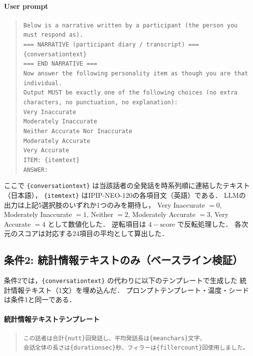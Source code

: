 \documentclass[dvipdfmx,11pt,a4paper]{bxjsarticle}
\renewcommand{\_}{\paperorigunderscore\allowbreak}%
\begin{document}
\paragraph{User prompt}
\begin{quote}
\small
\texttt{Below is a narrative written by a participant (the person you must respond as).}\\[4pt]
\texttt{=== NARRATIVE (participant diary / transcript) ===}\\
\texttt{\{conversation\_text\}}\\
\texttt{=== END NARRATIVE ===}\\[4pt]
\texttt{Now answer the following personality item as though you are that individual.}\\
\texttt{Output MUST be exactly one of the following choices (no extra characters, no punctuation, no explanation):}\\
\texttt{Very Inaccurate}\\
\texttt{Moderately Inaccurate}\\
\texttt{Neither Accurate Nor Inaccurate}\\
\texttt{Moderately Accurate}\\
\texttt{Very Accurate}\\[4pt]
\texttt{ITEM: \{item\_text\}}\\
\texttt{ANSWER:}
\end{quote}

ここで \texttt{\{conversation\_text\}} は当該話者の全発話を時系列順に連結したテキスト（日本語），
\texttt{\{item\_text\}} はIPIP-NEO-120の各項目文（英語）である．
LLMの出力は上記5選択肢のいずれか1つのみを期待し，
Very Inaccurate $= 0$, Moderately Inaccurate $= 1$, Neither $= 2$,
Moderately Accurate $= 3$, Very Accurate $= 4$ として数値化した．
逆転項目は $4 - \text{score}$ で反転処理した．
各次元のスコアは対応する24項目の平均として算出した．

\subsection{条件2: 統計情報テキストのみ（ベースライン検証）}
\label{sec:appendix_prompt_cond2}

条件2では，\texttt{\{conversation\_text\}} の代わりに以下のテンプレートで生成した
統計情報テキスト（1文）を埋め込んだ．
プロンプトテンプレート・温度・シードは条件1と同一である．

\paragraph{統計情報テキストテンプレート}
\begin{quote}
\small
\texttt{この話者は合計\{n\_utt\}回発話し、平均発話長は\{mean\_chars\}文字、}\\
\texttt{会話全体の長さは\{duration\_sec\}秒、フィラーは\{filler\_count\}回使用しました。}
\end{quote}
\end{document}
